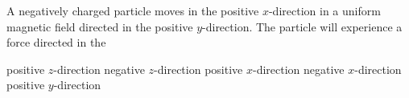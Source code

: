 \begin{questions}\setcounter{question}{16}\question
A negatively charged particle moves in the positive $x$-direction in a uniform magnetic field directed in the positive $y$-direction. The particle will experience a force directed in the

\begin{choices}
\choice positive $z$-direction
\choice negative $z$-direction
\choice positive $x$-direction
\choice negative $x$-direction
\choice positive $y$-direction
\end{choices}\end{questions}

